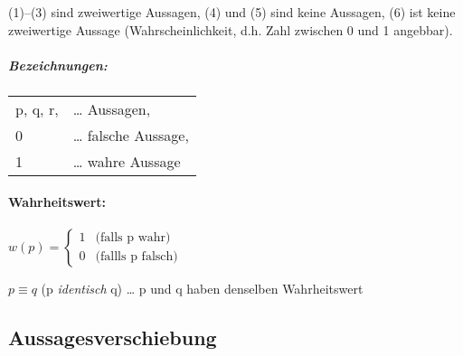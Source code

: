 (1)--(3) sind zweiwertige Aussagen, (4) und (5) sind keine Aussagen, (6) ist keine zweiwertige Aussage (Wahrscheinlichkeit, d.h. Zahl zwischen 0 und 1 angebbar).

\subparagraph{Bezeichnungen:} \parskp
\begin{tabular}{l l}
p, q, r, &… Aussagen,\\
0 &… falsche Aussage, \\
1 &… wahre Aussage\\
\end{tabular}

\paragraph{Wahrheitswert:} \parskp
$w(p)=\begin{cases}
1 & \text{(falls p wahr)} \\
0 & \text{(fallls p falsch)}
\end{cases}$
    
$p \equiv q$ (p \emph{identisch} q) … p und q haben denselben Wahrheitswert
    
\subsection{Aussagesverschiebung}

